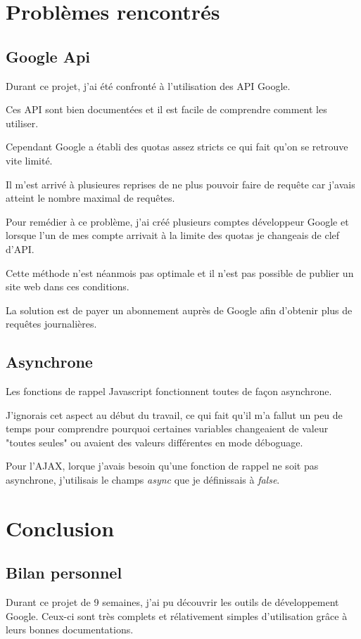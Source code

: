 \documentclass[a4paper]{article}
\begin{document}
\newpage
\section{Problèmes rencontrés}
\subsection{Google Api}
Durant ce projet, j'ai été confronté à l'utilisation des API Google. 

Ces API sont bien documentées et il est facile de comprendre comment les utiliser.

Cependant Google a établi des quotas assez stricts ce qui fait qu'on se retrouve vite limité.

Il m'est arrivé à plusieures reprises de ne plus pouvoir faire de requête car j'avais atteint le nombre maximal de requêtes. 

Pour remédier à ce problème, j'ai créé plusieurs comptes développeur Google et lorsque l'un de mes compte arrivait à la limite des quotas je changeais de clef d'API.

Cette méthode n'est néanmois pas optimale et il n'est pas possible de publier un site web dans ces conditions.

La solution est de payer un abonnement auprès de Google afin d'obtenir plus de requêtes journalières.
\subsection{Asynchrone}
Les fonctions de rappel Javascript fonctionnent toutes de façon asynchrone.

J'ignorais  cet aspect au début du travail, ce qui fait qu'il m'a fallut un peu de temps pour comprendre pourquoi certaines variables changeaient de valeur "toutes seules" ou avaient des valeurs différentes en mode déboguage.

Pour l'AJAX, lorque j'avais besoin qu'une fonction de rappel ne soit pas asynchrone, j'utilisais le champs \emph{async} que je définissais à \emph{false}.

\newpage
\section{Conclusion}
\subsection{Bilan personnel}
Durant ce projet de 9 semaines, j'ai pu découvrir les outils de développement Google. Ceux-ci sont très complets et rélativement simples d'utilisation grâce à leurs bonnes documentations. 
\end{document}
